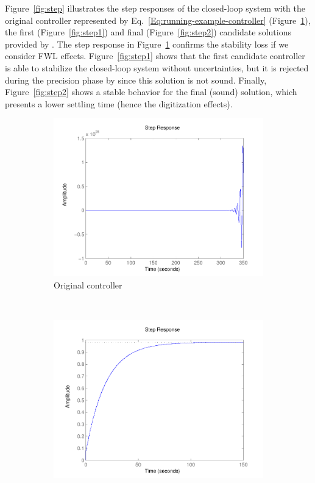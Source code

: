 \documentclass[final]{sig-alternate-05-2015}
\begin{document}
Figure~\ref{fig:step} illustrates the step responses of the closed-loop
system with the original controller represented by
Eq.~\eqref{Eq:running-example-controller} (Figure~\ref{fig:step0}), the
first (Figure~\ref{fig:step1}) and final (Figure~\ref{fig:step2}) candidate
solutions provided by \tool.  The step response in Figure~\ref{fig:step0}
confirms the stability loss if we consider FWL effects.  
Figure~\ref{fig:step1} shows that the first candidate controller is able to
stabilize the closed-loop system without uncertainties, but it is rejected
during the {\sc precision} phase by \tool since this solution is not
sound.  Finally, Figure~\ref{fig:step2} shows a stable
behavior for the final (sound) solution, which presents a lower settling
time (hence the digitization effects).

\begin{figure}
    \centering
    \begin{subfigure}[b]{0.3\textwidth}
        \includegraphics[width=\textwidth]{figures/runningexample_step0.pdf}
        \caption{Original controller}
        \label{fig:step0}
    \end{subfigure}
    ~
    \begin{subfigure}[b]{0.3\textwidth}
        \includegraphics[width=\textwidth]{figures/runningexample_step1.pdf}

\end{subfigure}
\end{figure}
\end{document}
